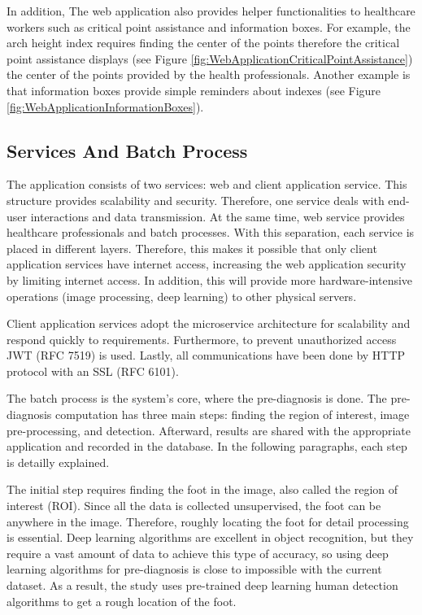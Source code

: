 In addition, The web application also provides helper functionalities to healthcare workers such as critical point assistance and information boxes. For example, the arch height index requires finding the center of the points therefore the critical point assistance displays (see Figure \ref{fig:WebApplicationCriticalPointAssistance}) the center of the points provided by the health professionals. Another example is that information boxes provide simple reminders about indexes (see Figure \ref{fig:WebApplicationInformationBoxes}).

\subsection{Services And Batch Process} \label{sec:StudyIServicesAndBatchProcess}
The application consists of two services: web and client application service. This structure provides scalability and security. Therefore, one service deals with end-user interactions and data transmission. At the same time, web service provides healthcare professionals and batch processes. With this separation, each service is placed in different layers. Therefore, this makes it possible that only client application services have internet access, increasing the web application security by limiting internet access. In addition, this will provide more hardware-intensive operations (image processing, deep learning) to other physical servers. 

Client application services adopt the microservice architecture for scalability and respond quickly to requirements. Furthermore, to prevent unauthorized access JWT (RFC 7519) is used. Lastly, all communications have been done by HTTP protocol with an SSL (RFC 6101). 

The batch process is the system's core, where the pre-diagnosis is done. The pre-diagnosis computation has three main steps: finding the region of interest, image pre-processing, and detection. Afterward, results are shared with the appropriate application and recorded in the database. In the following paragraphs, each step is detailly explained.

The initial step requires finding the foot in the image, also called the region of interest (ROI). Since all the data is collected unsupervised, the foot can be anywhere in the image. Therefore, roughly locating the foot for detail processing is essential. Deep learning algorithms are excellent in object recognition, but they require a vast amount of data to achieve this type of accuracy, so using deep learning algorithms for pre-diagnosis is close to impossible with the current dataset. As a result, the study uses pre-trained deep learning human detection algorithms to get a rough location of the foot.

